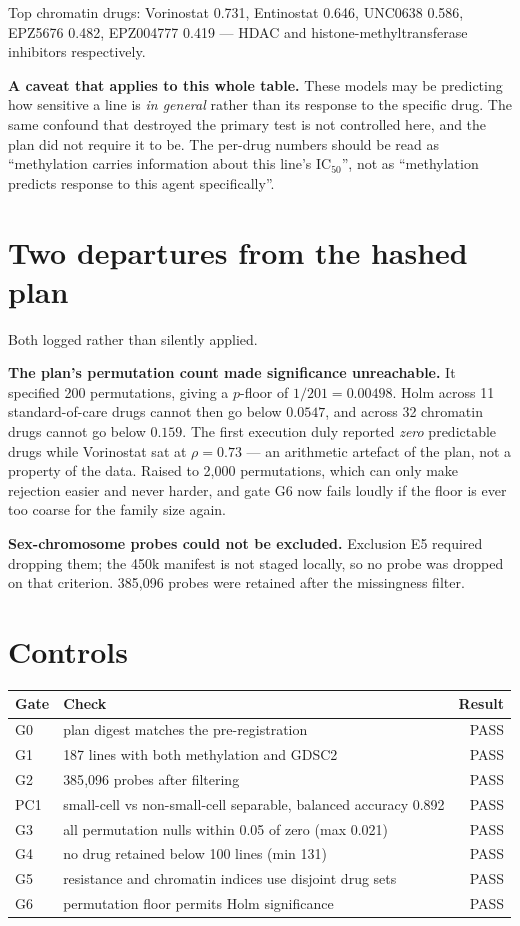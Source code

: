 \documentclass[11pt,a4paper]{article}
\begin{document}
Top chromatin drugs: Vorinostat 0.731, Entinostat 0.646, UNC0638 0.586, EPZ5676 0.482,
EPZ004777 0.419 --- HDAC and histone-methyltransferase inhibitors respectively.

\textbf{A caveat that applies to this whole table.} These models may be predicting how sensitive a
line is \emph{in general} rather than its response to the specific drug. The same confound that
destroyed the primary test is not controlled here, and the plan did not require it to be. The
per-drug numbers should be read as ``methylation carries information about this line's IC$_{50}$'',
not as ``methylation predicts response to this agent specifically''.

\section{Two departures from the hashed plan}

Both logged rather than silently applied.

\textbf{The plan's permutation count made significance unreachable.} It specified 200
permutations, giving a $p$-floor of $1/201 = 0.00498$. Holm across 11 standard-of-care drugs cannot
then go below $0.0547$, and across 32 chromatin drugs cannot go below $0.159$. The first execution
duly reported \emph{zero} predictable drugs while Vorinostat sat at $\rho = 0.73$ --- an arithmetic
artefact of the plan, not a property of the data. Raised to 2{,}000 permutations, which can only
make rejection easier and never harder, and gate G6 now fails loudly if the floor is ever too
coarse for the family size again.

\textbf{Sex-chromosome probes could not be excluded.} Exclusion E5 required dropping them; the 450k
manifest is not staged locally, so no probe was dropped on that criterion. 385{,}096 probes were
retained after the missingness filter.

\section{Controls}

\begin{center}
\begin{tabular}{@{}llr@{}}
\toprule
\textbf{Gate} & \textbf{Check} & \textbf{Result} \\
\midrule
G0 & plan digest matches the pre-registration & PASS \\
G1 & 187 lines with both methylation and GDSC2 & PASS \\
G2 & 385{,}096 probes after filtering & PASS \\
PC1 & small-cell vs non-small-cell separable, balanced accuracy 0.892 & PASS \\
G3 & all permutation nulls within 0.05 of zero (max 0.021) & PASS \\
G4 & no drug retained below 100 lines (min 131) & PASS \\
G5 & resistance and chromatin indices use disjoint drug sets & PASS \\
G6 & permutation floor permits Holm significance & PASS \\
\bottomrule
\end{tabular}
\end{center}
\end{document}
